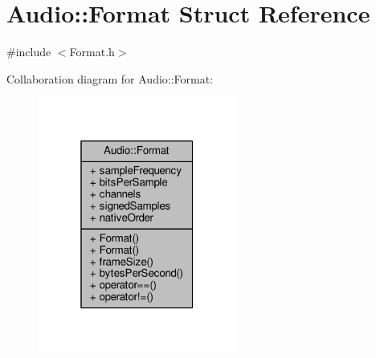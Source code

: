\hypertarget{structAudio_1_1Format}{}\section{Audio\+:\+:Format Struct Reference}
\label{structAudio_1_1Format}


{\ttfamily \#include $<$Format.\+h$>$}



Collaboration diagram for Audio\+:\+:Format\+:
\nopagebreak
\begin{figure}[H]
\begin{center}
\leavevmode
\includegraphics[width=184pt]{d6/d37/structAudio_1_1Format__coll__graph}
\end{center}
\end{figure}
